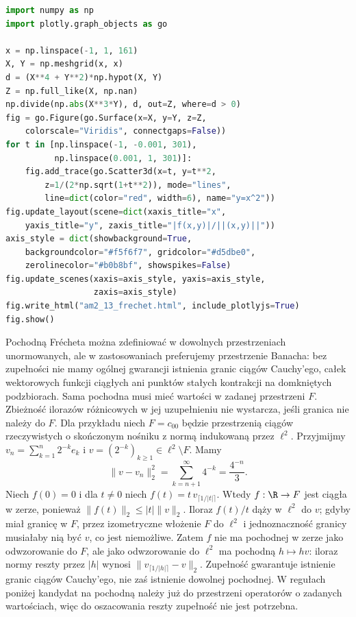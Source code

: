 \begin{lstlisting}[language=Python]
import numpy as np
import plotly.graph_objects as go

x = np.linspace(-1, 1, 161)
X, Y = np.meshgrid(x, x)
d = (X**4 + Y**2)*np.hypot(X, Y)
Z = np.full_like(X, np.nan)
np.divide(np.abs(X**3*Y), d, out=Z, where=d > 0)
fig = go.Figure(go.Surface(x=X, y=Y, z=Z,
    colorscale="Viridis", connectgaps=False))
for t in [np.linspace(-1, -0.001, 301),
          np.linspace(0.001, 1, 301)]:
    fig.add_trace(go.Scatter3d(x=t, y=t**2,
        z=1/(2*np.sqrt(1+t**2)), mode="lines",
        line=dict(color="red", width=6), name="y=x^2"))
fig.update_layout(scene=dict(xaxis_title="x",
    yaxis_title="y", zaxis_title="|f(x,y)|/||(x,y)||"))
axis_style = dict(showbackground=True,
    backgroundcolor="#f5f6f7", gridcolor="#d5dbe0",
    zerolinecolor="#b0b8bf", showspikes=False)
fig.update_scenes(xaxis=axis_style, yaxis=axis_style,
                  zaxis=axis_style)
fig.write_html("am2_13_frechet.html", include_plotlyjs=True)
fig.show()
\end{lstlisting}


\begin{uwaga}
\label{ma2:rem:frechet-completion}
Pochodną Frécheta można zdefiniować w dowolnych
przestrzeniach unormowanych, ale w zastosowaniach
preferujemy przestrzenie Banacha: bez zupełności nie
mamy ogólnej gwarancji istnienia granic ciągów Cauchy'ego,
całek wektorowych funkcji ciągłych ani punktów stałych
kontrakcji na domkniętych podzbiorach. Sama pochodna
musi mieć wartości w zadanej przestrzeni $F$.
Zbieżność ilorazów różnicowych w jej uzupełnieniu nie
wystarcza, jeśli granica nie należy do $F$.
Dla przykładu niech $F=c_{00}$ będzie przestrzenią
ciągów rzeczywistych o skończonym nośniku z normą
indukowaną przez $\ell^2$. Przyjmijmy
$v_n=\sum_{k=1}^n 2^{-k}e_k$ i
$v=(2^{-k})_{k\ge1}\in\ell^2\setminus F$.
Mamy
\[
 \|v-v_n\|_2^2=\sum_{k=n+1}^\infty 4^{-k}
 =\frac{4^{-n}}3.
\]
Niech $f(0)=0$ i dla $t\ne0$ niech
$f(t)=t\,v_{\lceil 1/|t|\rceil}$.
Wtedy $f:\R\to F$ jest ciągła w zerze, ponieważ
$\|f(t)\|_2\le |t|\|v\|_2$.
Iloraz $f(t)/t$ dąży w $\ell^2$ do $v$;
gdyby miał granicę w $F$, przez izometryczne
włożenie $F$ do $\ell^2$ i jednoznaczność granicy
musiałaby nią być $v$, co jest niemożliwe.
Zatem $f$ nie ma pochodnej w zerze jako odwzorowanie
do $F$, ale jako odwzorowanie do $\ell^2$ ma
pochodną $h\mapsto hv$: iloraz normy reszty przez
$|h|$ wynosi $\|v_{\lceil1/|h|\rceil}-v\|_2$.
Zupełność gwarantuje istnienie granic ciągów
Cauchy'ego, nie zaś istnienie dowolnej pochodnej.
W regułach poniżej kandydat na pochodną należy już
do przestrzeni operatorów o zadanych wartościach,
więc do oszacowania reszty zupełność nie jest potrzebna.
\end{uwaga}

